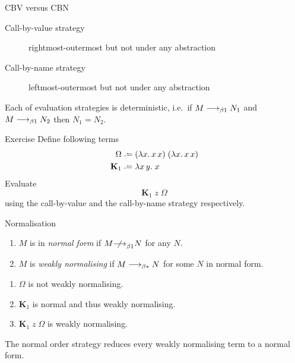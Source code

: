 \begin{frame}{CBV versus CBN}
\begin{description}
  \item[Call-by-value strategy]
    rightmost-outermost but not under any abstraction
  \item[Call-by-name strategy]
    leftmost-outermost but not under any abstraction
\end{description}

\begin{proposition}[Determinacy]
  Each of evaluation strategies is deterministic, i.e.\ 
  if $M \longrightarrow_{\beta1} N_1$ and $M \longrightarrow_{\beta1} N_2$ then $N_1 = N_2$.
\end{proposition}
\end{frame}

\begin{frame}{Exercise}
  Define following terms
\begin{align*}
  \Omega &\defeq (\lambda x.\, x\,x)\;(\lambda x.\,x\,x) \\
  \mathbf{K}_1 & \defeq \lambda x\,y.\;x
\end{align*}
Evaluate 
\[
  \mathbf{K}_1\;z\;\Omega
\]
using the call-by-value and the call-by-name strategy respectively.
\end{frame}

\begin{frame}{Normalisation}
\begin{definition}
  \begin{enumerate}
    \item $M$ is in \emph{normal form} if $M \notonereduce N$ for any $N$. 
    \item $M$ is \emph{weakly normalising} if $M \longrightarrow_{\beta*} N$ for some $N$ in
      normal form.
  \end{enumerate}
\end{definition}
%
  \begin{enumerate}
    \item $\Omega$ is not weakly normalising.
    \item $\mathbf{K}_1$ is normal and thus weakly normalising.
    \item $\mathbf{K}_1\;z\; \Omega$ is weakly normalising.
  \end{enumerate}

\begin{theorem}
  The normal order strategy reduces every weakly
  normalising term to a normal form.
\end{theorem}

\end{frame}

